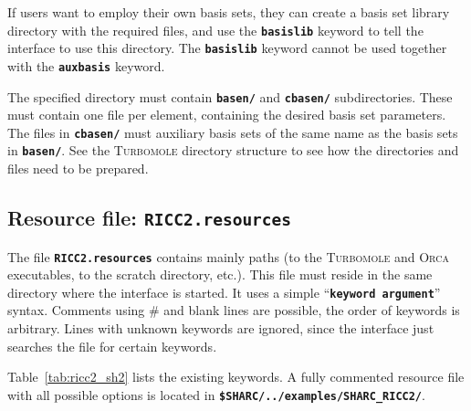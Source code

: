 \documentclass[a4paper,10pt,DIV=15,openany]{scrbook}
\newcommand{\todo}[1]{\textcolor{RL}{#1}}
\newcommand{\ttt}[1]{\textbf{\texttt{#1}}}
\begin{document}
If users want to employ their own basis sets, they can create a basis set library directory with the required files, and use the \ttt{basislib} keyword to tell the interface to use this directory.
The \ttt{basislib} keyword cannot be used together with the \ttt{auxbasis} keyword.

The specified directory must contain \ttt{basen/} and \ttt{cbasen/} subdirectories. These must contain one file per element, containing the desired basis set parameters.
The files in \ttt{cbasen/} must auxiliary basis sets of the same name as the basis sets in \ttt{basen/}.
See the \textsc{Turbomole} directory structure to see how the directories and files need to be prepared.




\subsection{Resource file: \ttt{RICC2.resources}}

The file \ttt{RICC2.resources} contains mainly paths (to the \textsc{Turbomole} and \textsc{Orca} executables, to the scratch directory, etc.). This file must reside in the same directory where the interface is started. It uses a simple ``\ttt{keyword argument}'' syntax. Comments using \# and blank lines are possible, the order of keywords is arbitrary. Lines with unknown keywords are ignored, since the interface just searches the file for certain keywords.

Table~\ref{tab:ricc2_sh2} lists the existing keywords.
A fully commented resource file with all possible options is located in \ttt{\$SHARC/../examples/SHARC\_RICC2/}.
\end{document}
